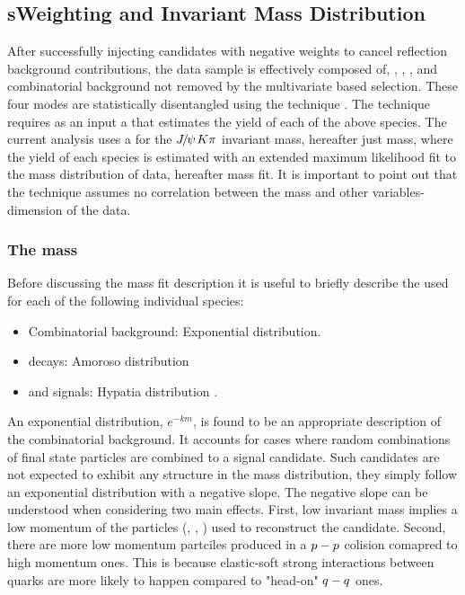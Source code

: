 \subsection{sWeighting and Invariant Mass Distribution}
\label{sWeighting_and_mass}

After successfully injecting candidates with negative weights to cancel reflection background contributions,
the data sample is effectively composed of, \BdJpsiKpi, \BsJpsiKpi, \LbJpsippi, and combinatorial background not removed by the
multivariate based selection. These four modes are statistically disentangled using the \sPlot technique \cite{splot}.
The technique requires as an input a \pdf that estimates the yield of each of the above species. The current analysis uses
a \pdf for the ${J\mskip -3mu/\mskip -2mu\psi\mskip 2mu} K\pi$ invariant mass, hereafter just mass, where the yield of each species is estimated with an extended
maximum likelihood fit to the mass distribution of data, hereafter mass fit. It is important to point out that the \sPlot
technique assumes no correlation between the mass and other variables-dimension of the data.

\subsubsection{The mass \pdf}
Before discussing the mass fit description it is useful to briefly describe the \pdfs used for each of the following individual species:

\begin{itemize}
\item Combinatorial background: Exponential distribution.
\item \LbJpsippi decays: Amoroso distribution \cite{Amoroso}
\item \Bd and \Bs signals: Hypatia distribution \cite{Santos:2013gra}.
\end{itemize}

\noindent An exponential distribution, $e^{-km}$, is found to be an appropriate description of the combinatorial background. It accounts
for cases where random combinations of final state particles are combined to a signal candidate. Such candidates are not expected to
exhibit any structure in the mass distribution, they simply follow an exponential distribution with a negative slope.
The negative slope can be understood when considering two main effects. First, low \Bs invariant mass implies a low momentum of
the particles (\kaon, \pion, \mmu) used to reconstruct the \BsJpsiKst candidate. Second, there are more low momentum partciles produced in
a $p-p$ colision comapred to high momentum ones. This is because elastic-soft strong interactions between quarks are more
likely to happen compared to "head-on" $q-q$ ones.

